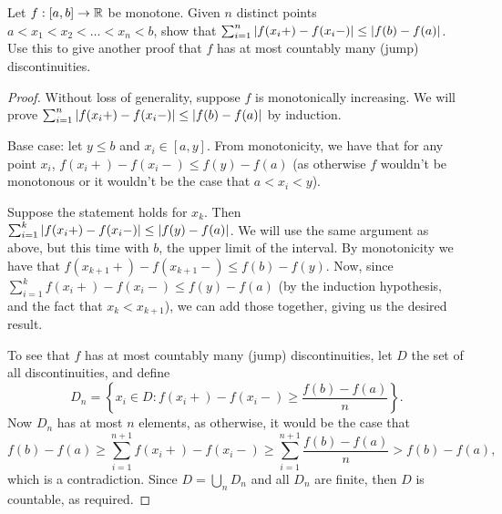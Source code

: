 \begin{exercise}{33}
Let $f:[a,b]\to\mathbb{R}$ be monotone. Given $n$ distinct points $a<x_1<x_2<\dots<x_n<b$, show that $\sum_{i=1}^n\left\lvert f(x_i+)-f(x_i-)\right\rvert\leq \left\lvert f(b)-f(a)\right\rvert$. Use this to give another proof that $f$ has at most countably many (jump) discontinuities.
\end{exercise}
\begin{proof}
Without loss of generality, suppose $f$ is monotonically increasing. We will prove $\sum_{i=1}^n\left\lvert f(x_i+)-f(x_i-)\right\rvert\leq \left\lvert f(b)-f(a)\right\rvert$ by induction.

Base case: let $y\leq b$ and $x_i\in[a,y]$. From monotonicity, we have that for any point $x_i$, $f(x_i+)-f(x_i-)\leq f(y)-f(a)$ (as otherwise $f$ wouldn't be monotonous or it wouldn't be the case that $a<x_i<y$).

Suppose the statement holds for $x_k$. Then $\sum_{i=1}^k\left\lvert f(x_i+)-f(x_i-)\right\rvert\leq \left\lvert f(y)-f(a)\right\rvert$. We will use the same argument as above, but this time with $b$, the upper limit of the interval. By monotonicity we have that $f(x_{k+1}+)-f(x_{k+1}-)\leq f(b)-f(y)$. Now, since $\sum_{i=1}^k f(x_i+)-f(x_i-)\leq f(y)-f(a)$ (by the induction hypothesis, and the fact that $x_k<x_{k+1}$), we can add those together, giving us the desired result.



To see that $f$ has at most countably many (jump) discontinuities, let $D$ the set of all discontinuities, and define
\[
    D_n=\left\{x_i\in D: f(x_i+)-f(x_i-)\geq\frac{f(b)-f(a)}{n}\right\}.
\]
Now $D_n$ has at most $n$ elements, as otherwise, it would be the case that 
\[
f(b)-f(a)\geq\sum_{i=1}^{n+1}f(x_i+)-f(x_i-) \geq\sum_{i=1}^{n+1}\frac{f(b)-f(a)}{n} > f(b)-f(a),
\]
which is a contradiction. Since $D=\bigcup_nD_n$ and all $D_n$ are finite, then $D$ is countable, as required.
\end{proof} 